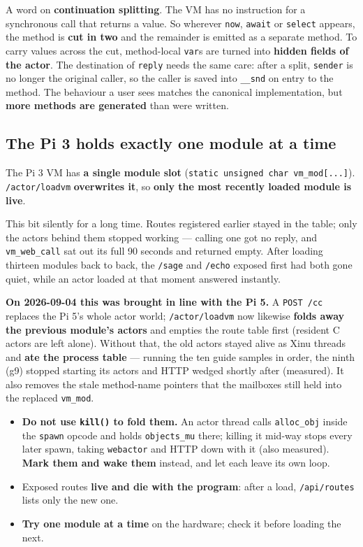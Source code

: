 \documentclass[11pt,a4paper]{article}
\begin{document}
A word on \textbf{continuation splitting}. The VM has no instruction for a
synchronous call that returns a value. So wherever \texttt{now},
\texttt{await} or \texttt{select} appears, the method is \textbf{cut in two}
and the remainder is emitted as a separate method. To carry values across the
cut, method-local \texttt{var}s are turned into \textbf{hidden fields of the
actor}. The destination of \texttt{reply} needs the same care: after a split,
\texttt{sender} is no longer the original caller, so the caller is saved into
\texttt{\_\_snd} on entry to the method. The behaviour a user sees matches the
canonical implementation, but \textbf{more methods are generated} than were
written.

\subsection{The Pi 3 holds exactly one module at a time}
\label{sec:pi3-onemodule}

The Pi 3 VM has \textbf{a single module slot}
(\texttt{static unsigned char vm\_mod[...]}). \texttt{/actor/loadvm}
\textbf{overwrites it}, so \textbf{only the most recently loaded module is
live}.

This bit silently for a long time. Routes registered earlier stayed in the
table; only the actors behind them stopped working --- calling one got no reply,
and \texttt{vm\_web\_call} sat out its full 90 seconds and returned empty. After
loading thirteen modules back to back, the \texttt{/sage} and \texttt{/echo}
exposed first had both gone quiet, while an actor loaded at that moment
answered instantly.

\textbf{On 2026-09-04 this was brought in line with the Pi 5.} A \texttt{POST /cc}
replaces the Pi 5's whole actor world; \texttt{/actor/loadvm} now likewise
\textbf{folds away the previous module's actors} and empties the route table
first (resident C actors are left alone). Without that, the old actors stayed
alive as Xinu threads and \textbf{ate the process table} --- running the ten
guide samples in order, the ninth (g9) stopped starting its actors and HTTP
wedged shortly after (measured). It also removes the stale method-name pointers
that the mailboxes still held into the replaced \texttt{vm\_mod}.

\begin{itemize}
\item \textbf{Do not use \texttt{kill()} to fold them.} An actor thread calls
  \texttt{alloc\_obj} inside the \texttt{spawn} opcode and holds
  \texttt{objects\_mu} there; killing it mid-way stops every later spawn, taking
  \texttt{webactor} and HTTP down with it (also measured). \textbf{Mark them and
  wake them} instead, and let each leave its own loop.
\item Exposed routes \textbf{live and die with the program}: after a load,
  \texttt{/api/routes} lists only the new one.
\item \textbf{Try one module at a time} on the hardware; check it before
  loading the next.
\end{itemize}
\end{document}

